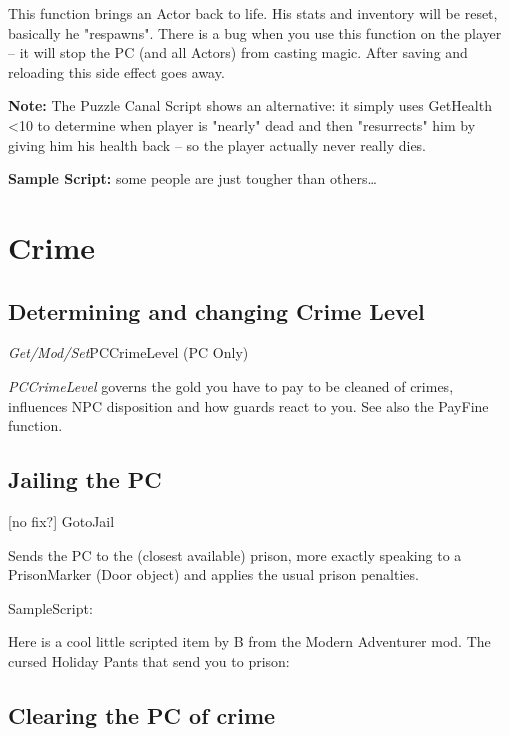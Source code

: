 This function brings an Actor back to life. His stats and inventory will
be reset, basically he "respawns". There is a bug when you use this
function on the player -- it will stop the PC (and all Actors) from
casting magic. After saving and reloading this side effect goes away.

\textbf{Note:} The Puzzle Canal Script shows an alternative: it simply
uses GetHealth \textless10 to determine when player is "nearly" dead and
then "resurrects" him by giving him his health back -- so the player
actually never really dies.

\textbf{Sample Script:} some people are just tougher than others\ldots{}



\hypertarget{crime}{%
\section{\texorpdfstring{\hfill\break
Crime}{ Crime}}\label{crime}}

\hypertarget{determining-and-changing-crime-level}{%
\subsection{Determining and changing Crime
Level}\label{determining-and-changing-crime-level}}

\emph{Get/Mod/Set}PCCrimeLevel (PC Only)

\emph{PCCrimeLevel} governs the gold you have to pay to be cleaned of
crimes, influences NPC disposition and how guards react to you. See also
the PayFine function.

\hypertarget{jailing-the-pc}{%
\subsection{Jailing the PC}\label{jailing-the-pc}}

{[}no fix?{]} GotoJail

Sends the PC to the (closest available) prison, more exactly speaking to
a PrisonMarker (Door object) and applies the usual prison penalties.

SampleScript:

Here is a cool little scripted item by B from the Modern Adventurer mod.
The cursed Holiday Pants that send you to prison:



\hypertarget{clearing-the-pc-of-crime}{%
\subsection{Clearing the PC of crime}\label{clearing-the-pc-of-crime}}

